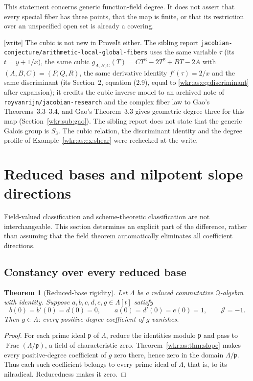 \documentclass[11pt,a4paper]{article}
\numberwithin{equation}{section}
\newtheorem{theorem}{Theorem}[section]
\theoremstyle{definition}
\theoremstyle{remark}
\newcommand{\Q}{\mathbb{Q}}
\newcommand{\J}{\mathcal{J}}
\newcommand{\rpath}[1]{\nolinkurl{#1}}
\newcommand{\Frac}{\operatorname{Frac}}
\begin{document}
This statement concerns generic function-field degree. It does not assert
that every special fiber has three points, that the map is finite, or
that its restriction over an unspecified open set is already a covering.

\noindent\textup{[write]} The cubic is not new in ProveIt either. The
sibling report \rpath{jacobian-conjecture/arithmetic-local-global-fibers}
uses the same variable $\tau$ (its $t=y+1/x$), the same cubic
$g_{A,B,C}(T)=CT^3-2T^2+BT-2A$ with $(A,B,C)=(P,Q,R)$, the same
derivative identity $f'(\tau)=2/x$ and the same discriminant (its
Section~2, equation (2.9), equal to \eqref{wkr:as:eq:discriminant} after
expansion);
it credits the cubic inverse model to an archived note of
\texttt{royvanrijn/jacobian-research} and the complex fiber law to Gao's
Theorems~3.3--3.4, and Gao's Theorem~3.3 gives geometric degree three for
this map (Section~\ref{wkr:sub:gao}). The sibling report does not state
that the generic Galois group is $S_3$. The cubic relation, the discriminant identity and the
degree profile of Example~\ref{wkr:as:ex:shear} were rechecked at the
write.

\section{Reduced bases and nilpotent slope directions}
\label{wkr:as:sec:deformations}

Field-valued classification and scheme-theoretic classification are not
interchangeable. This section determines an explicit part of the
difference, rather than assuming that the field theorem automatically
eliminates all coefficient directions.

\subsection{Constancy over every reduced base}

\begin{theorem}[Reduced-base rigidity]\label{wkr:as:thm:reduced}
Let $\Lambda$ be a reduced commutative $\Q$-algebra with identity.
Suppose $a,b,c,d,e,g\in\Lambda[t]$ satisfy
\[
b(0)=b'(0)=d(0)=0,\qquad a(0)=d'(0)=e(0)=1,
\qquad \J=-1.
\]
Then $g\in\Lambda$: every positive-degree coefficient of $g$ vanishes.
\end{theorem}
\begin{proof}
For each prime ideal $\mathfrak p$ of $\Lambda$, reduce the identities
modulo $\mathfrak p$ and pass to $\Frac(\Lambda/\mathfrak p)$, a field of
characteristic zero. Theorem~\ref{wkr:as:thm:slope} makes every
positive-degree coefficient of $g$ zero there, hence zero in the domain
$\Lambda/\mathfrak p$. Thus each such coefficient belongs to every prime
ideal of $\Lambda$, that is, to its nilradical. Reducedness makes it zero.
\end{proof}
\end{document}
